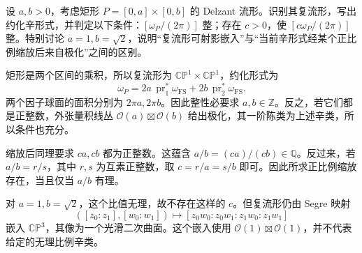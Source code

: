\begin{exercise}\label{g4:ex:1205:irrational-box-class}
	设 \(a,b>0\)，考虑矩形 \(P=[0,a]\times[0,b]\) 的 Delzant 流形。识别其复流形，写出约化辛形式，并判定以下条件：\([\omega_P/(2\pi)]\) 整；存在 \(c>0\)，使 \([c\omega_P/(2\pi)]\) 整。特别讨论 \(a=1,b=\sqrt2\)，说明“复流形可射影嵌入”与“当前辛形式经某个正比例缩放后来自极化”之间的区别。
\end{exercise}
\begin{solution}
	矩形是两个区间的乘积，所以复流形为
	\(\mathbb{CP}^1\times\mathbb{CP}^1\)，约化形式为
	\[
		\omega_P=2a\,\operatorname{pr}_1^*\omega_{\mathrm{FS}}
		+2b\,\operatorname{pr}_2^*\omega_{\mathrm{FS}}.
	\]
	两个因子球面的面积分别为 \(2\pi a,2\pi b\)。因此整性必要求 \(a,b\in\mathbb Z\)。反之，若它们都是正整数，外张量积线丛
	\(\mathcal O(a)\boxtimes\mathcal O(b)\) 给出极化，其一阶陈类为上述辛类，所以条件也充分。

	缩放后同理要求 \(ca,cb\) 都为正整数。这蕴含 \(a/b=(ca)/(cb)\in\mathbb Q\)。反过来，若 \(a/b=r/s\)，其中 \(r,s\) 为互素正整数，取 \(c=r/a=s/b\) 即可。因此所求正比例缩放存在，当且仅当 \(a/b\) 有理。

	对 \(a=1,b=\sqrt2\)，这个比值无理，故不存在这样的 \(c\)。但复流形仍由 Segre 映射
	\[
		([z_0:z_1],[w_0:w_1])
		\longmapsto[z_0w_0:z_0w_1:z_1w_0:z_1w_1]
	\]
	嵌入 \(\mathbb{CP}^3\)，其像为一个光滑二次曲面。这个嵌入使用 \(\mathcal O(1)\boxtimes\mathcal O(1)\)，并不代表给定的无理比例辛类。
\end{solution}

